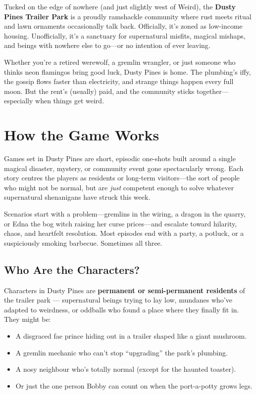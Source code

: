 Tucked on the edge of nowhere (and just slightly west of Weird), the \textbf{Dusty Pines Trailer Park} is a proudly ramshackle community where rust meets ritual and lawn ornaments occasionally talk back. Officially, it’s zoned as low-income housing. Unofficially, it’s a sanctuary for supernatural misfits, magical mishaps, and beings with nowhere else to go---or no intention of ever leaving.

Whether you’re a retired werewolf, a gremlin wrangler, or just someone who thinks neon flamingos bring good luck, Dusty Pines is home. The plumbing’s iffy, the gossip flows faster than electricity, and strange things happen every full moon. But the rent’s (usually) paid, and the community sticks together---especially when things get weird.

\section{How the Game Works}

Games set in Dusty Pines are short, episodic one-shots built around a single magical disaster, mystery, or community event gone spectacularly wrong. Each story centres the players as residents or long-term visitors---the sort of people who might not be normal, but are \textit{just} competent enough to solve whatever supernatural shenanigans have struck this week.

Scenarios start with a problem---gremlins in the wiring, a dragon in the quarry, or Edna the bog witch raising her curse prices---and escalate toward hilarity, chaos, and heartfelt resolution. Most episodes end with a party, a potluck, or a suspiciously smoking barbecue. Sometimes all three.

\subsection{Who Are the Characters?}

Characters in Dusty Pines are \textbf{permanent or semi-permanent residents} of the trailer park --- supernatural beings trying to lay low, mundanes who’ve adapted to weirdness, or oddballs who found a place where they finally fit in. They might be:

\begin{itemize}
  \item A disgraced fae prince hiding out in a trailer shaped like a giant mushroom.
  \item A gremlin mechanic who can’t stop ``upgrading'' the park’s plumbing.
  \item A nosy neighbour who’s totally normal (except for the haunted toaster).
  \item Or just the one person Bobby can count on when the port-a-potty grows legs.
\end{itemize}

